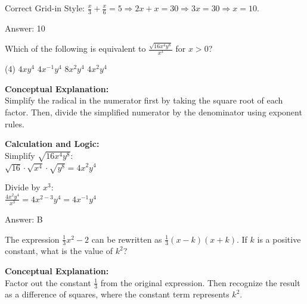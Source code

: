 \documentclass[11pt,paper=a4,answers]{exam}
\begin{document}
\begin{questions}
\begin{solution}
\vspace{10pt}

Correct Grid-in Style: $\frac{x}{3} + \frac{x}{6} = 5 \Rightarrow 2x + x = 30 \Rightarrow 3x = 30 \Rightarrow x = 10$.

\vspace{25pt}

Answer: \colorbox{yellow!100}{10}
\end{solution}

\vspace{40pt}

\question
Which of the following is equivalent to $\frac{\sqrt{16x^4y^8}}{x^3}$ for $x > 0$?
\begin{tasks}(4)
    \task $4xy^4$
    \task $4x^{-1}y^4$
    \task $8x^2y^4$
    \task $4x^2y^4$
\end{tasks}

\begin{solution}
\textbf{Conceptual Explanation:} \\
Simplify the radical in the numerator first by taking the square root of each factor. Then, divide the simplified numerator by the denominator using exponent rules.

\vspace{20pt}

\textbf{Calculation and Logic:} \\
Simplify $\sqrt{16x^4y^8}$: \\
$\sqrt{16} \cdot \sqrt{x^4} \cdot \sqrt{y^8} = 4x^2y^4$

\vspace{10pt}

Divide by $x^3$: \\
$\frac{4x^2y^4}{x^3} = 4x^{2-3}y^4 = 4x^{-1}y^4$

\vspace{25pt}

Answer: \colorbox{yellow!100}{B}
\end{solution}

\vspace{40pt}

\question
The expression $\frac{1}{3}x^2 - 2$ can be rewritten as $\frac{1}{3}(x-k)(x+k)$. If $k$ is a positive constant, what is the value of $k^2$?

\begin{solution}
\textbf{Conceptual Explanation:} \\
Factor out the constant $\frac{1}{3}$ from the original expression. Then recognize the result as a difference of squares, where the constant term represents $k^2$.


\end{solution}
\end{questions}
\end{document}

